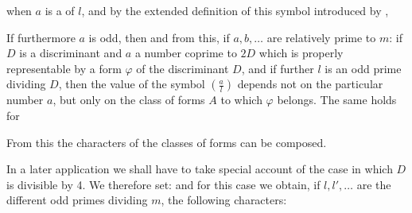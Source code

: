 when $a$ is a  of $l$, and by the extended definition
of this symbol introduced by ,

If furthermore $a$ is odd, then
and from this, if $a, b, \dots$ are relatively prime to $m$:
if $D$ is a discriminant and $a$ a number coprime to $2D$ which is
properly representable by a form $\varphi$ of the discriminant $D$,
 and if further $l$ is an odd prime dividing $D$,
then the value of the symbol $\left(\frac{a}{l}\right)$ depends not on the particular
number $a$, but only on the class of forms $A$ to which $\varphi$ belongs.
The same holds for

From this the characters of the classes of forms can be
composed.

In a later application we shall have to take special account
 of the case in which $D$ is divisible by 4.
We therefore set:
and for this case we obtain, if $l, l', \dots$ are the different
odd primes dividing $m$, the following
characters:
